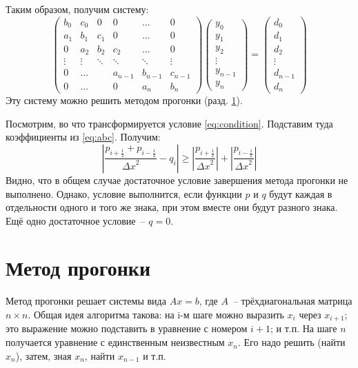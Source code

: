 \documentclass[10pt]{article}
\newcommand{\half}{\ensuremath{\frac{1}{2}}}
\begin{document}
	Таким образом, получим систему:
	\begin{equation}
		\begin{pmatrix}b_0    & c_0    & 0      & 0       & \ldots & 0\\
					   a_1    & b_1    & c_1    & 0       & \ldots & 0 \\
					   0      & a_2    & b_2    & c_2     & \ldots & 0\\
					   \vdots & \vdots & \ddots & \ddots  & \ddots & \vdots\\
					   0	  & \ldots &        & a_{n-1} & b_{n-1} & c_{n-1}\\
					   0      & \ldots &        & 0        & a_n     & b_n
		\end{pmatrix}
		\begin{pmatrix}
			y_0\\
			y_1\\
			y_2\\
			\vdots\\
			y_{n-1}\\
			y_n
		\end{pmatrix} = 
		\begin{pmatrix}
			d_0\\
			d_1\\
			d_2\\
			\vdots\\
			d_{n-1}\\
			d_n
		\end{pmatrix}
	\end{equation}
	Эту систему можно решить методом прогонки (разд. \ref{section:run}).
	
	Посмотрим, во что трансформируется условие \ref{eq:condition}. Подставим туда коэффициенты из \ref{eq:abc}. Получим:
	\begin{equation}
		|\frac{p_{i + \half} + p_{i - \half}}{{\Delta x}^2} - q_i| \ge |\frac{p_{i + \half}}{{\Delta x}^2}| + |\frac{p_{i - \half}}{{\Delta x}^2}|
	\end{equation}
	Видно, что в общем случае достаточное условие завершения метода прогонки не выполнено. Однако, условие выполнится,
	если функции $p$ и $q$ будут каждая в отдельности одного и того же знака, при этом вместе они будут разного знака.
	Ещё одно достаточное условие~-- $q = 0$.

\section{Метод прогонки}\label{section:run}
	Метод прогонки решает системы вида $Ax=b$, где $A$~-- трёхдиагональная матрица $n \times n$. Общая идея алгоритма такова: на i-м шаге
	можно выразить $x_i$ через $x_{i+1}$; это выражение можно подставить в уравнение с номером $i+1$; и т.п. 
	На шаге $n$ получается уравнение с единственным неизвестным $x_n$. Его надо решить (найти $x_n$), затем, зная $x_n$, найти $x_{n-1}$ и т.п.
\end{document}
